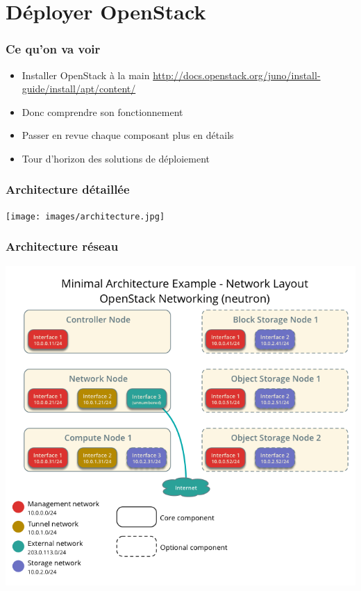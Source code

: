   \section{Déployer OpenStack}

  \begin{frame}
    \frametitle{Ce qu'on va voir}
    \begin{itemize}
      \item Installer OpenStack à la main \url{http://docs.openstack.org/juno/install-guide/install/apt/content/}
      \item Donc comprendre son fonctionnement
      \item Passer en revue chaque composant plus en détails
      \item Tour d'horizon des solutions de déploiement
    \end{itemize}
  \end{frame}

  \begin{frame}
    \frametitle{Architecture détaillée}
    \begin{center}
      \texttt{[image: images/architecture.jpg]}
    \end{center}
  \end{frame}

  \begin{frame}
    \frametitle{Architecture réseau}
    \begin{center}
      \includegraphics[width=\textwidth]{images/archi-network.png}
    \end{center}
  \end{frame}

